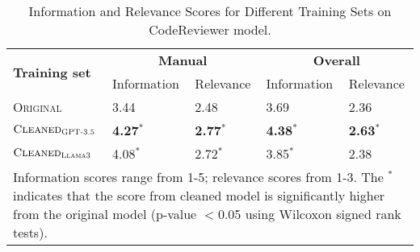 \begin{table}[t!]
\setlength{\tabcolsep}{4pt}
\centering
\caption{\label{tab:information_relevance_scores}Information and Relevance Scores for Different Training Sets on CodeReviewer model.}
\begin{tabular}{l|ll|ll}
\toprule
\multirow{2}{*}{\textbf{Training set}} & \multicolumn{2}{c|}{\textbf{Manual}} & \multicolumn{2}{c}{\textbf{Overall}}  \\
\cmidrule(lr){2-5} %
&  Information & Relevance & Information & Relevance \\
\midrule
\textsc{Original} & 3.44 &  2.48 & 3.69  & 2.36 \\
$\textsc{Cleaned}_{\textsc{GPT-3.5}}$ & \textbf{4.27}$^{*}$ & \textbf{2.77}$^{*}$ & \textbf{4.38}$^{*}$  & \textbf{2.63}$^{*}$\\
$\textsc{Cleaned}_{\textsc{Llama3}}$  & 4.08$^{*}$ & 2.72$^{*}$ & 3.85$^{*}$ &  2.38\\
\bottomrule
\multicolumn{5}{p{8.5cm}}{\footnotesize Information scores range from 1-5; relevance scores from 1-3. The $^*$ indicates that the score from cleaned model is significantly higher from the original model (p-value $<$0.05 using Wilcoxon signed rank tests).}
\end{tabular}
\end{table}


 
